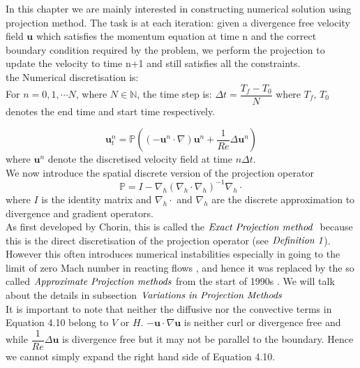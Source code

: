 In this chapter we are mainly interested in constructing numerical solution using projection method. The task is at each iteration: given a divergence free velocity field $\textbf{u}$ which satisfies the momentum equation at time n and the correct boundary condition required by the problem, we perform the projection to update the velocity to time n+1 and still satisfies all the constraints.\\

the Numerical discretisation is:\\
For $n = 0,1,\cdots N$, where $N \in \mathbb{N}$, the time step is: $\Delta t = \dfrac{T_f - T_0}{N}$ where $T_f,\,T_0$ denotes the end time and start time respectively.

\begin{equation}
\textbf{u}^n_t = \mathbb{P} ((-\textbf{u}^{n} \cdot \nabla) \textbf{u}^{n} + \dfrac{1}{Re} \Delta \textbf{u}^n)
\end{equation}
where $\textbf{u}^n$ denote the discretised velocity field at time $n\Delta t$.\\
We now introduce the spatial discrete version of the projection operator
\begin{equation}
\mathbb{P} = I - \nabla_h (\nabla_h \cdot \nabla_h)^{-1} \nabla_h \cdot
\end{equation}
where $\textit{I}$ is the identity matrix and $\nabla_h \cdot$ and $\nabla_h$ are the discrete approximation to divergence and gradient operators.\\

As first developed by Chorin, this is called the $\emph{Exact Projection method }$ \cite{chorin1968numerical,almgren1996numerical,almgren2000approximate} because this is the direct discretisation of the projection operator (see $\emph{Definition 1}$). However this often introduces numerical instabilities especially in going to the limit of zero Mach number in reacting flows \cite{almgren1996numerical,almgren2000approximate,lal1993projection,minion1996projection}, and hence it was replaced by the so called $\emph{Approximate Projection methods}$ from the start of 1990s 
\cite{brown2001accurate,almgren1996numerical,almgren2000approximate}. We will talk about the details in subsection $\emph{Variations in Projection Methods}$\\

It is important to note that neither the diffusive nor the convective terms in Equation 4.10 belong to $\textit{V}$ or $\textit{H}$. $-\textbf{u} \cdot \nabla \textbf{u}$ is neither curl or divergence free and while $\dfrac{1}{Re} \Delta \textbf{u}$ is divergence free but it may not be parallel to the boundary. Hence we cannot simply expand the right hand side of Equation 4.10.\\

